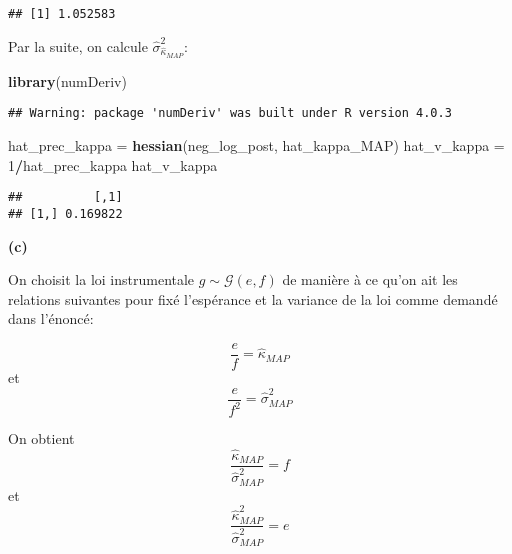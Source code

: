 \documentclass[
]{article}
\newenvironment{Shaded}{\begin{snugshade}}{\end{snugshade}}
\newcommand{\DecValTok}[1]{\textcolor[rgb]{0.00,0.00,0.81}{#1}}
\newcommand{\KeywordTok}[1]{\textcolor[rgb]{0.13,0.29,0.53}{\textbf{#1}}}
\newcommand{\NormalTok}[1]{#1}
\newcommand{\OperatorTok}[1]{\textcolor[rgb]{0.81,0.36,0.00}{\textbf{#1}}}
\newcommand{\StringTok}[1]{\textcolor[rgb]{0.31,0.60,0.02}{#1}}
\begin{document}
\begin{verbatim}
## [1] 1.052583
\end{verbatim}

Par la suite, on calcule \(\hat{\sigma}_{\hat{\kappa}_{MAP}}^2\):

\begin{Shaded}
\begin{Highlighting}[]
\KeywordTok{library}\NormalTok{(numDeriv)}
\end{Highlighting}
\end{Shaded}

\begin{verbatim}
## Warning: package 'numDeriv' was built under R version 4.0.3
\end{verbatim}

\begin{Shaded}
\begin{Highlighting}[]
\NormalTok{hat_prec_kappa =}\StringTok{ }\KeywordTok{hessian}\NormalTok{(neg_log_post, hat_kappa_MAP)}
\NormalTok{hat_v_kappa =}\StringTok{ }\DecValTok{1}\OperatorTok{/}\NormalTok{hat_prec_kappa}
\NormalTok{hat_v_kappa}
\end{Highlighting}
\end{Shaded}

\begin{verbatim}
##          [,1]
## [1,] 0.169822
\end{verbatim}

\textbf{(c)}

On choisit la loi instrumentale \(g \sim \mathcal{G}(e,f)\) de manière à
ce qu'on ait les relations suivantes pour fixé l'espérance et la
variance de la loi comme demandé dans l'énoncé:

\[\dfrac{e}{f} = \hat{\kappa}_{MAP}\] et
\[\dfrac{e}{f^{2}} = \hat{\sigma}_{MAP}^2 \]

On obtient \[\dfrac{\hat{\kappa}_{MAP}}{\hat{\sigma}_{MAP}^2} = f \] et
\[\dfrac{\hat{\kappa}_{MAP}^{2}}{\hat{\sigma}_{MAP}^2}  = e\]
\end{document}
